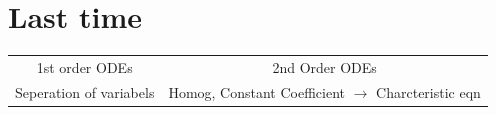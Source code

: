 \documentclass[11pt]{article}
\begin{document}
\section{Last time}

\begin{tabular}{c|c}
    1st order ODEs & 2nd Order ODEs  \\
    Seperation of variabels & Homog, Constant Coefficient $\rightarrow$ Charcteristic eqn
\end{tabular}
\end{document}
